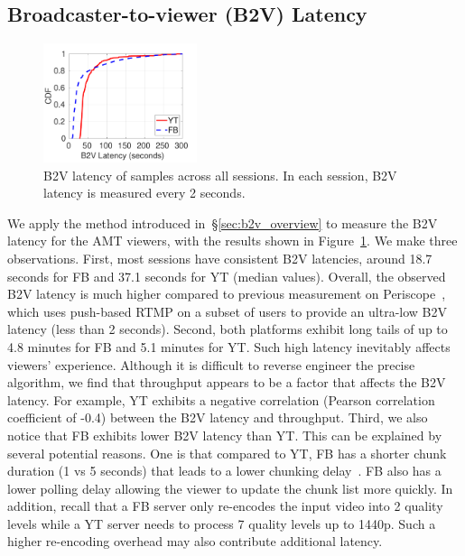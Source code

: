 \subsection{Broadcaster-to-viewer (B2V) Latency}
\label{sec:b2v}

\begin{figure}[t]
	\centering
	\centering
	\small
	\includegraphics[width=0.4\textwidth]{figs/lime/e2e_latency.pdf}
	\caption{B2V latency of samples across all sessions. In each session, B2V latency is measured every 2 seconds.}
	\label{fig:e2e_latency}
\end{figure}

We apply the method introduced in~\S\ref{sec:b2v_overview} to measure the B2V latency for the AMT viewers, with the results shown in Figure~\ref{fig:e2e_latency}. %
%
We make three observations.
%
First, most sessions have consistent B2V latencies, around 18.7 seconds for FB and 37.1 seconds for YT (median values). Overall, the observed B2V latency is much higher compared to previous measurement on Periscope~\cite{wang16}, which uses push-based RTMP on a subset of users to provide an ultra-low B2V latency (less than 2 seconds).
%
Second, both platforms exhibit long tails of up to 4.8 minutes for FB and 5.1 minutes for YT. Such high latency inevitably affects viewers' experience.
Although it is difficult to reverse engineer the precise algorithm, we find that throughput appears to be a factor that affects the B2V latency. For example, YT exhibits a negative correlation (Pearson correlation coefficient of -0.4) between the B2V latency and throughput.
%
Third, we also notice that FB exhibits lower B2V latency than YT.
This can be explained by several potential reasons.
%
One is that compared to YT, FB has a shorter chunk duration (1 vs 5 seconds) that leads to a lower chunking delay~\cite{wang16}. FB also has a lower polling delay allowing the viewer to update the chunk list more quickly. In addition, recall that a FB server only re-encodes the input video into 2 quality levels while a YT server needs to process 7 quality levels up to 1440p. Such a higher re-encoding overhead may also contribute additional latency.


